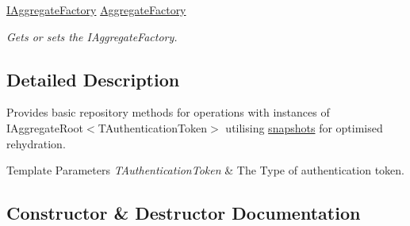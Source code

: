 \begin{DoxyCompactItemize}
\hyperlink{interfaceCqrs_1_1Domain_1_1Factories_1_1IAggregateFactory}{I\+Aggregate\+Factory} \hyperlink{classCqrs_1_1Akka_1_1Snapshots_1_1AkkaSnapshotRepository_a359251dfcca7e157ace7dac46bdf18ef_a359251dfcca7e157ace7dac46bdf18ef}{Aggregate\+Factory}
\begin{DoxyCompactList}\small\item\em Gets or sets the I\+Aggregate\+Factory. \end{DoxyCompactList}\end{DoxyCompactItemize}


\subsection{Detailed Description}
Provides basic repository methods for operations with instances of I\+Aggregate\+Root$<$\+T\+Authentication\+Token$>$ utilising \hyperlink{}{snapshots} for optimised rehydration. 


\begin{DoxyTemplParams}{Template Parameters}
{\em T\+Authentication\+Token} & The Type of authentication token.\\
\hline
\end{DoxyTemplParams}


\subsection{Constructor \& Destructor Documentation}
\mbox{\label{classCqrs_1_1Akka_1_1Snapshots_1_1AkkaSnapshotRepository_a59f8c7dabed645143699a8849627c213_a59f8c7dabed645143699a8849627c213}} 
